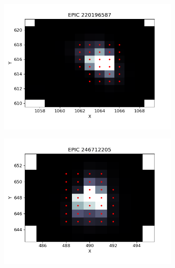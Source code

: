  \begin{figure}
\centering
 \begin{subfigure}[b]{0.5\linewidth}
    \centering
    \includegraphics[width=\linewidth]{6-images/EPIC220196587_PIXEL_FILE.png} 
    \label{EPIC220196587_PIXEL_FILE} 
    \vspace{4ex}
  \end{subfigure}%
  \begin{subfigure}[b]{0.5\linewidth}
    \centering
    \includegraphics[width=\linewidth]{6-images/EPIC246712205_PIXEL_FILE.png} 
    \label{EPIC246712205_PIXEL_FILE} 
    \vspace{4ex}
  \end{subfigure} 

\end{figure}
